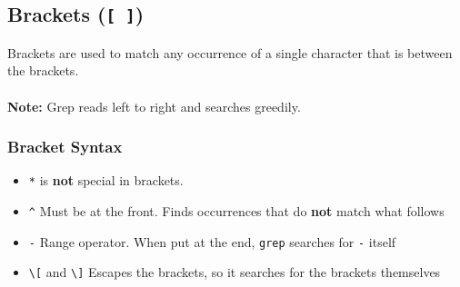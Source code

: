 \documentclass[13pt]{article}
\begin{document}
\subsection{Brackets (\texttt{[ ]})}
Brackets are used to match any occurrence of a single character that is between the brackets. \\ \\
\textbf{Note:} Grep reads left to right and searches greedily.
\subsubsection{Bracket Syntax}
\begin{itemize}[leftmargin = 0pt]
\item [] \texttt{*} is \textbf{not} special in brackets.
\item [] \texttt{\^} Must be at the front. Finds occurrences that do \textbf{not} match what follows
\item [] \texttt{-} Range operator. When put at the end, \texttt{grep} searches for \texttt{-} itself
\item [] \texttt{\textbackslash [} and \texttt{\textbackslash ]} Escapes the brackets, so it searches for the brackets themselves
\end{itemize}
\end{document}
